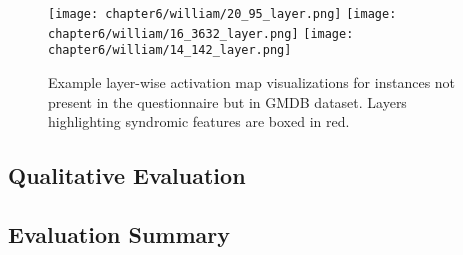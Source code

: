 \documentclass[../report.tex]{subfiles}
\begin{document}
	\begin{sidewaysfigure}
		\texttt{[image: chapter6/william/20\_95\_layer.png]}		
		\texttt{[image: chapter6/william/16\_3632\_layer.png]}
		\texttt{[image: chapter6/william/14\_142\_layer.png]}
		\caption[Example layer-wise activation map visualizations for instances not present in the questionnaire but in GMDB dataset]{Example layer-wise activation map visualizations for instances not present in the questionnaire but in GMDB dataset. Layers highlighting syndromic features are boxed in red.}
		\label{fig_layer_gmdb}
	\end{sidewaysfigure}

	\subsection{Qualitative Evaluation}
  
    \subsection{Evaluation Summary}
    \pagebreak
\end{document}
